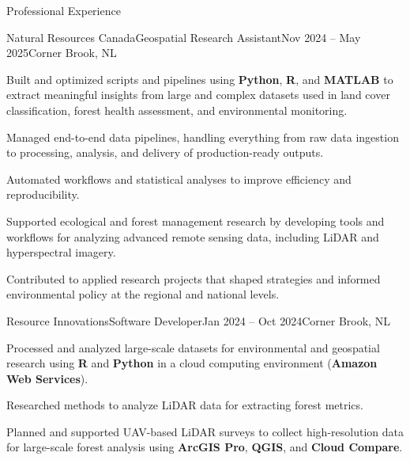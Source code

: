 \documentclass[]{Keenan-Nicholson-Resume}
\begin{document}
\resumeheader
{}
{}
{}
{}
{}

\begin{section}{Professional Experience}
    \begin{subsection}{Natural Resources Canada}{Geospatial Research Assistant}{Nov 2024 -- May 2025}{Corner Brook, NL}
        \item Built and optimized scripts and pipelines using \textbf{Python}, \textbf{R}, and \textbf{MATLAB} to extract meaningful insights from large and complex datasets used in land cover classification, forest health assessment, and environmental monitoring.
        \item Managed end-to-end data pipelines, handling everything from raw data ingestion to processing, analysis, and delivery of production-ready outputs.
        \item Automated workflows and statistical analyses to improve efficiency and reproducibility.
        \item Supported ecological and forest management research by developing tools and workflows for analyzing advanced remote sensing data, including LiDAR and hyperspectral imagery.
        \item Contributed to applied research projects that shaped strategies and informed environmental policy at the regional and national levels.
    \end{subsection}
    
    \begin{subsection}{Resource Innovations}{Software Developer}{Jan 2024 -- Oct 2024}{Corner Brook, NL}
        \item Processed and analyzed large-scale datasets for environmental and geospatial research using \textbf{R} and \textbf{Python} in a cloud computing environment (\textbf{Amazon Web Services}).
        \item Researched methods to analyze LiDAR data for extracting forest metrics.
        \item Planned and supported UAV-based LiDAR surveys to collect high-resolution data for large-scale forest analysis using \textbf{ArcGIS Pro}, \textbf{QGIS}, and \textbf{Cloud Compare}.
    \end{subsection}
    

\end{section}
\end{document}
